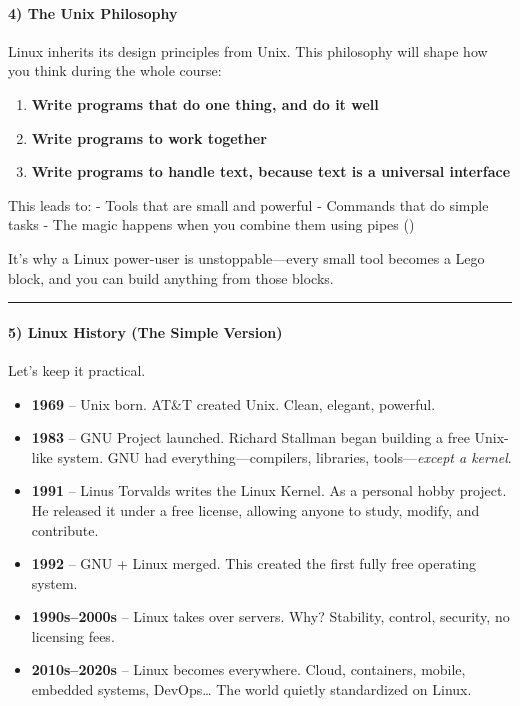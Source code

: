\documentclass[
  english,
  paper=a4,
  oneside  ,captions=tableheading
]{scrartcl}
\providecommand{\tightlist}{%
  \setlength{\itemsep}{0pt}\setlength{\parskip}{0pt}}
\begin{document}
\paragraph{4) The Unix Philosophy}\label{the-unix-philosophy}

Linux inherits its design principles from Unix. This philosophy will
shape how you think during the whole course:

\begin{enumerate}
\def\labelenumi{\arabic{enumi}.}
\tightlist
\item
  \textbf{Write programs that do one thing, and do it well}
\item
  \textbf{Write programs to work together}
\item
  \textbf{Write programs to handle text, because text is a universal
  interface}
\end{enumerate}

This leads to: - Tools that are small and powerful - Commands that do
simple tasks - The magic happens when you combine them using pipes
(\texttt{\textbar{}})

It's why a Linux power-user is unstoppable---every small tool becomes a
Lego block, and you can build anything from those blocks.

\begin{center}\rule{0.5\linewidth}{0.5pt}\end{center}

\paragraph{5) Linux History (The Simple
Version)}\label{linux-history-the-simple-version}

Let's keep it practical.

\begin{itemize}
\tightlist
\item
  \textbf{1969} -- Unix born. AT\&T created Unix. Clean, elegant,
  powerful.
\item
  \textbf{1983} -- GNU Project launched. Richard Stallman began building
  a free Unix-like system. GNU had everything---compilers, libraries,
  tools---\emph{except a kernel}.
\item
  \textbf{1991} -- Linus Torvalds writes the Linux Kernel. As a personal
  hobby project. He released it under a free license, allowing anyone to
  study, modify, and contribute.
\item
  \textbf{1992} -- GNU + Linux merged. This created the first fully free
  operating system.
\item
  \textbf{1990s--2000s} -- Linux takes over servers. Why? Stability,
  control, security, no licensing fees.
\item
  \textbf{2010s--2020s} -- Linux becomes everywhere. Cloud, containers,
  mobile, embedded systems, DevOps\ldots{} The world quietly
  standardized on Linux.
\end{itemize}
\end{document}

